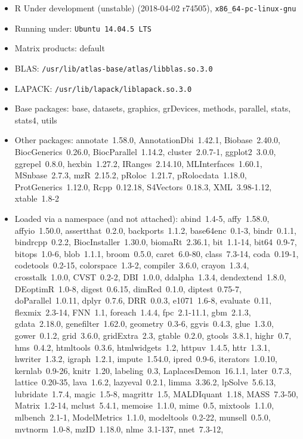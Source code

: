\documentclass[12pt]{article}\usepackage[]{graphicx}\usepackage[]{color}
\begin{document}
\begin{appendices}
\begin{itemize}\raggedright
  \item R Under development (unstable) (2018-04-02 r74505), \verb|x86_64-pc-linux-gnu|
  \item Running under: \verb|Ubuntu 14.04.5 LTS|
  \item Matrix products: default
  \item BLAS: \verb|/usr/lib/atlas-base/atlas/libblas.so.3.0|
  \item LAPACK: \verb|/usr/lib/lapack/liblapack.so.3.0|
  \item Base packages: base, datasets, graphics, grDevices,
    methods, parallel, stats, stats4, utils
  \item Other packages: annotate~1.58.0, AnnotationDbi~1.42.1,
    Biobase~2.40.0, BiocGenerics~0.26.0, BiocParallel~1.14.2,
    cluster~2.0.7-1, ggplot2~3.0.0, ggrepel~0.8.0, hexbin~1.27.2,
    IRanges~2.14.10, MLInterfaces~1.60.1, MSnbase~2.7.3,
    mzR~2.15.2, pRoloc~1.21.7, pRolocdata~1.18.0,
    ProtGenerics~1.12.0, Rcpp~0.12.18, S4Vectors~0.18.3,
    XML~3.98-1.12, xtable~1.8-2
  \item Loaded via a namespace (and not attached): abind~1.4-5,
    affy~1.58.0, affyio~1.50.0, assertthat~0.2.0, backports~1.1.2,
    base64enc~0.1-3, bindr~0.1.1, bindrcpp~0.2.2,
    BiocInstaller~1.30.0, biomaRt~2.36.1, bit~1.1-14, bit64~0.9-7,
    bitops~1.0-6, blob~1.1.1, broom~0.5.0, caret~6.0-80,
    class~7.3-14, coda~0.19-1, codetools~0.2-15, colorspace~1.3-2,
    compiler~3.6.0, crayon~1.3.4, crosstalk~1.0.0, CVST~0.2-2,
    DBI~1.0.0, ddalpha~1.3.4, dendextend~1.8.0, DEoptimR~1.0-8,
    digest~0.6.15, dimRed~0.1.0, diptest~0.75-7,
    doParallel~1.0.11, dplyr~0.7.6, DRR~0.0.3, e1071~1.6-8,
    evaluate~0.11, flexmix~2.3-14, FNN~1.1, foreach~1.4.4,
    fpc~2.1-11.1, gbm~2.1.3, gdata~2.18.0, genefilter~1.62.0,
    geometry~0.3-6, ggvis~0.4.3, glue~1.3.0, gower~0.1.2,
    grid~3.6.0, gridExtra~2.3, gtable~0.2.0, gtools~3.8.1,
    highr~0.7, hms~0.4.2, htmltools~0.3.6, htmlwidgets~1.2,
    httpuv~1.4.5, httr~1.3.1, hwriter~1.3.2, igraph~1.2.1,
    impute~1.54.0, ipred~0.9-6, iterators~1.0.10, kernlab~0.9-26,
    knitr~1.20, labeling~0.3, LaplacesDemon~16.1.1, later~0.7.3,
    lattice~0.20-35, lava~1.6.2, lazyeval~0.2.1, limma~3.36.2,
    lpSolve~5.6.13, lubridate~1.7.4, magic~1.5-8, magrittr~1.5,
    MALDIquant~1.18, MASS~7.3-50, Matrix~1.2-14, mclust~5.4.1,
    memoise~1.1.0, mime~0.5, mixtools~1.1.0, mlbench~2.1-1,
    ModelMetrics~1.1.0, modeltools~0.2-22, munsell~0.5.0,
    mvtnorm~1.0-8, mzID~1.18.0, nlme~3.1-137, nnet~7.3-12,

\end{itemize}
\end{appendices}
\end{document}
